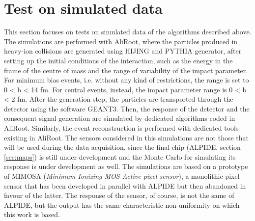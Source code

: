 \section{Test on simulated data}
This section focuses on tests on simulated data of the algorithms described above. The simulations are performed with AliRoot, where the particles produced in heavy-ion collisions are generated using HIJING and PYTHIA generator, after setting up the initial conditions of the interaction, such as the energy in the frame of the centre of mass and the range of variability of the impact parameter. For minimum bias events, i.e. without any kind of restrictions, the range is set to 0 < b < 14 fm. For central events, instead, the impact parameter range is 0 < b < 2 fm. After the generation step, the particles are transported through the detector using the software GEANT3. Then, the response of the detector and the consequent signal generation are simulated by dedicated algorithms coded in AliRoot. Similarly, the event reconstruction is performed with dedicated tools existing in AliRoot. The sensors considered in this simulations are not those that will be used during the data acquisition, since the final chip (ALPIDE, section \ref{sec:maps}) is still under development and the Monte Carlo for simulating its response is under development as well. The simulations are based on a prototype of MIMOSA (\textit{Minimum Ionizing MOS Active pixel sensor}), a monolithic pixel sensor that has been developed in parallel with ALPIDE but then abandoned in favour of the latter. The response of the sensor, of course, is not the same of ALPIDE, but the output has the same characteristic non-uniformity on which this work is based.\\ 
%
